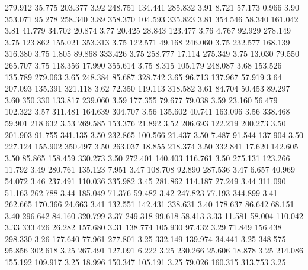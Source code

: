  279.912   35.775  203.377         3.92
 248.751  134.441  285.832         3.91
   8.721   57.173    0.966         3.90
 353.071   95.278  258.340         3.89
 358.370  104.593  335.823         3.81
 354.546   58.340  161.042         3.81
  41.779   34.702   20.874         3.77
  20.425   28.843  123.477         3.76
   4.767   92.929  278.149         3.75
 123.862  155.021  353.313         3.75
 122.571   49.168  246.060         3.75
 232.577  168.139  316.380         3.75
   1.805   89.868  333.426         3.75
 258.777   17.114  275.349         3.75
  13.030   79.550  265.707         3.75
 118.356   17.990  355.614         3.75
   8.315  105.179  248.087         3.68
 153.526  135.789  279.063         3.65
 248.384   85.687  328.742         3.65
  96.713  137.967   57.919         3.64
 207.093  135.391  321.118         3.62
  72.350  119.113  318.582         3.61
  84.704   50.453   89.297         3.60
 350.330  133.817  239.060         3.59
 177.355   79.677   79.038         3.59
  23.160   56.479  102.322         3.57
 311.481  164.639  304.707         3.56
 135.602   40.741  163.096         3.56
 338.468   59.901  218.632         3.53
 269.585  153.376   21.892         3.52
 206.693  122.219  200.273         3.50
 201.903   91.755  341.135         3.50
 232.865  100.566   21.437         3.50
   7.487   91.544  137.904         3.50
 227.124  155.902  350.497         3.50
 263.037   18.855  218.374         3.50
 332.841   17.620  142.605         3.50
  85.865  158.459  330.273         3.50
 272.401  140.403  116.761         3.50
 275.131  123.266   11.792         3.49
 280.761  135.123    7.951         3.47
 108.708   92.890  287.536         3.47
   6.657   40.969   54.072         3.46
 237.491  110.036  335.982         3.45
 281.862  114.187   27.249         3.44
 311.090   51.163  262.788         3.44
 185.049   71.376   59.482         3.42
 247.823   77.193  344.899         3.41
 262.665  170.366   24.663         3.41
 132.551  142.431  338.631         3.40
 178.637   86.642   68.151         3.40
 296.642   84.160  320.799         3.37
 249.318   99.618   58.413         3.33
  11.581   58.004  110.042         3.33
 333.426   26.282  157.680         3.31
 138.774  105.930   97.432         3.29
  71.849  156.438  298.330         3.26
 177.640   77.961  277.801         3.25
 332.149  139.974   34.441         3.25
 348.575   95.856  302.618         3.25
 267.491  127.091    6.222         3.25
 230.266   25.606   18.878         3.25
 214.086  155.192  109.917         3.25
  18.996  150.347  105.191         3.25
  79.026  160.315  313.753         3.25

